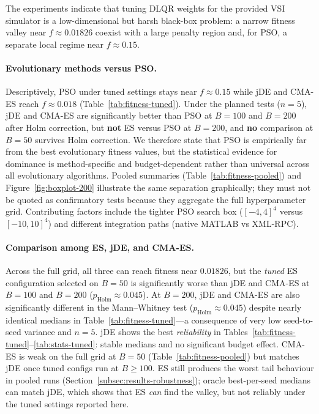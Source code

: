 \documentclass[pdflatex,sn-mathphys-num]{sn-jnl}
\begin{document}
The experiments indicate that tuning DLQR weights for the provided VSI simulator is a low-dimensional but harsh black-box problem: a narrow fitness valley near $f\approx0.01826$ coexist with a large penalty region and, for PSO, a separate local regime near $f\approx0.15$.

\paragraph{Evolutionary methods versus PSO.}
Descriptively, PSO under tuned settings stays near $f\approx0.15$ while jDE and CMA-ES reach $f\approx0.018$ (Table~\ref{tab:fitness-tuned}).
Under the planned tests ($n=5$), jDE and CMA-ES are significantly better than PSO at $B=100$ and $B=200$ after Holm correction, but \textbf{not} ES versus PSO at $B=200$, and \textbf{no} comparison at $B=50$ survives Holm correction.
We therefore state that PSO is empirically far from the best evolutionary fitness values, but the statistical evidence for dominance is method-specific and budget-dependent rather than universal across all evolutionary algorithms.
Pooled summaries (Table~\ref{tab:fitness-pooled}) and Figure~\ref{fig:boxplot-200} illustrate the same separation graphically; they must not be quoted as confirmatory tests because they aggregate the full hyperparameter grid.
Contributing factors include the tighter PSO search box ($[-4,4]^4$ versus $[-10,10]^4$) and different integration paths (native MATLAB vs XML-RPC).

\paragraph{Comparison among ES, jDE, and CMA-ES.}
Across the full grid, all three can reach fitness near $0.01826$, but the \emph{tuned} ES configuration selected on $B=50$ is significantly worse than jDE and CMA-ES at $B=100$ and $B=200$ ($p_{\mathrm{Holm}}\approx0.045$).
At $B=200$, jDE and CMA-ES are also significantly different in the Mann--Whitney test ($p_{\mathrm{Holm}}\approx0.045$) despite nearly identical medians in Table~\ref{tab:fitness-tuned}---a consequence of very low seed-to-seed variance and $n=5$.
jDE shows the best \emph{reliability} in Tables~\ref{tab:fitness-tuned}--\ref{tab:stats-tuned}: stable medians and no significant budget effect.
CMA-ES is weak on the full grid at $B=50$ (Table~\ref{tab:fitness-pooled}) but matches jDE once tuned configs run at $B\ge100$.
ES still produces the worst tail behaviour in pooled runs (Section~\ref{subsec:results-robustness}); oracle best-per-seed medians can match jDE, which shows that ES \emph{can} find the valley, but not reliably under the tuned settings reported here.
\end{document}
